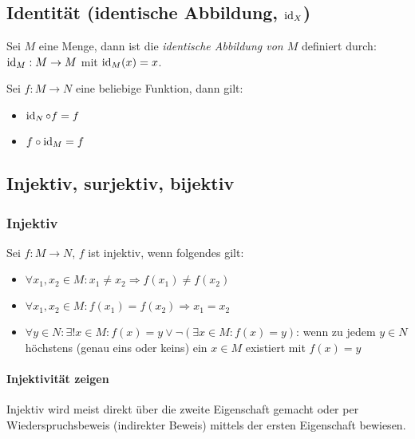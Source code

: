 \subsection{Identität (identische Abbildung, $\operatorname{id}_X$)}\index{$\id$}
Sei $M$ eine Menge, dann ist die \textit{identische Abbildung von $M$} definiert durch:
$\operatorname{id}_M: M \rightarrow M$ mit $\operatorname{id}_M(x) = x$.

Sei $f: M \rightarrow N$ eine beliebige Funktion, dann gilt:
\begin{itemize}
	\item $\operatorname{id}_N \circ f = f$
	\item $f \circ \operatorname{id}_M = f$
\end{itemize}

\subsection{Injektiv, surjektiv, bijektiv}
\subsubsection{Injektiv}
Sei $f: M \rightarrow N$, $f$ ist injektiv, wenn folgendes gilt:
\begin{itemize}
	\item $\forall x_1, x_2 \in M: x_1 \neq x_2 \Rightarrow f(x_1) \neq f(x_2)$
	\item $\forall x_1, x_2 \in M: f(x_1) = f(x_2) \Rightarrow x_1 = x_2$
	\item $\forall y \in N: \exists !x \in M: f(x) = y \lor \lnot(\exists x \in M: f(x) = y)$: wenn zu jedem $y \in N$ höchstens (genau eins oder keins) ein $x \in M$ existiert mit $f(x) = y$
\end{itemize}


\paragraph{Injektivität zeigen}
Injektiv wird meist direkt über die zweite Eigenschaft gemacht oder per Wiederspruchsbeweis (indirekter Beweis) mittels der ersten Eigenschaft bewiesen.

